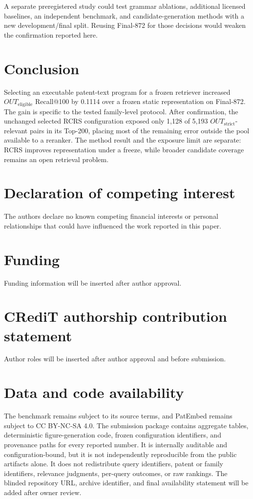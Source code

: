 \documentclass[final,5p,times,twocolumn]{elsarticle}
\newcommand{\RCRS}{RCRS}
\begin{document}
A separate preregistered study could test grammar ablations, additional licensed
baselines, an independent benchmark, and candidate-generation methods with a
new development/final split. Reusing Final-872 for those decisions would weaken the
confirmation reported here.

\section{Conclusion}

Selecting an executable patent-text program for a frozen retriever increased
\(OUT_{\mathrm{eligible}}\) Recall@100 by 0.1114 over a frozen static representation on Final-872.
The gain is specific to the tested family-level protocol. After confirmation,
the unchanged selected RCRS configuration exposed only 1,128 of 5,193
\(OUT_{\mathrm{strict}}\)-relevant pairs in
its Top-200, placing most of the remaining error outside the pool available to
a reranker. The method result and the exposure limit are separate: \RCRS{}
improves representation under a freeze, while broader candidate coverage
remains an open retrieval problem.

\section*{Declaration of competing interest}

The authors declare no known competing financial interests or personal
relationships that could have influenced the work reported in this paper.

\section*{Funding}

Funding information will be inserted after author approval.

\section*{CRediT authorship contribution statement}

Author roles will be inserted after author approval and before submission.

\section*{Data and code availability}

The benchmark remains subject to its source terms, and PatEmbed remains subject
to CC BY-NC-SA 4.0. The submission package contains aggregate tables,
deterministic figure-generation code, frozen configuration identifiers, and
provenance paths for every reported number. It is internally auditable and
configuration-bound, but it is not independently reproducible from the public
artifacts alone. It does not redistribute query
identifiers, patent or family identifiers, relevance judgments, per-query
outcomes, or raw rankings. The blinded repository URL, archive identifier,
and final availability statement will be added after owner review.
\end{document}
